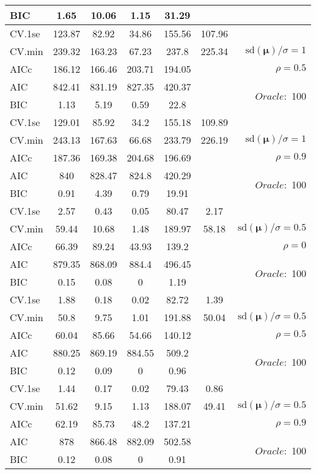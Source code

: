 \begin{table}
\begin{center}
\begin{tabular}{l*{5}{c}|r}
BIC & 1.65 & 10.06 & 1.15 & 31.29 & &  \\
 \hline 
CV.1se & 123.87 & 82.92 & 34.86 & 155.56 & 107.96 & \\
CV.min & 239.32 & 163.23 & 67.23 & 237.8 & 225.34 &  $\mathrm{sd}(\mathbf{\mu})/\sigma=1$ \\
AICc & 186.12 & 166.46 & 203.71 & 194.05 & & $\rho=0.5$ \\
AIC & 842.41 & 831.19 & 827.35 & 420.37 & &  \multirow{2}{*}{$Oracle: $ 100} \\
BIC & 1.13 & 5.19 & 0.59 & 22.8 & &  \\
 \hline 
CV.1se & 129.01 & 85.92 & 34.2 & 155.18 & 109.89 & \\
CV.min & 243.13 & 167.63 & 66.68 & 233.79 & 226.19 &  $\mathrm{sd}(\mathbf{\mu})/\sigma=1$ \\
AICc & 187.36 & 169.38 & 204.68 & 196.69 & & $\rho=0.9$ \\
AIC & 840 & 828.47 & 824.8 & 420.29 & &  \multirow{2}{*}{$Oracle: $ 100} \\
BIC & 0.91 & 4.39 & 0.79 & 19.91 & &  \\
 \hline 
CV.1se & 2.57 & 0.43 & 0.05 & 80.47 & 2.17 & \\
CV.min & 59.44 & 10.68 & 1.48 & 189.97 & 58.18 &  $\mathrm{sd}(\mathbf{\mu})/\sigma=0.5$ \\
AICc & 66.39 & 89.24 & 43.93 & 139.2 & & $\rho=0$ \\
AIC & 879.35 & 868.09 & 884.4 & 496.45 & &  \multirow{2}{*}{$Oracle: $ 100} \\
BIC & 0.15 & 0.08 & 0 & 1.19 & &  \\
 \hline 
CV.1se & 1.88 & 0.18 & 0.02 & 82.72 & 1.39 & \\
CV.min & 50.8 & 9.75 & 1.01 & 191.88 & 50.04 &  $\mathrm{sd}(\mathbf{\mu})/\sigma=0.5$ \\
AICc & 60.04 & 85.66 & 54.66 & 140.12 & & $\rho=0.5$ \\
AIC & 880.25 & 869.19 & 884.55 & 509.2 & &  \multirow{2}{*}{$Oracle: $ 100} \\
BIC & 0.12 & 0.09 & 0 & 0.96 & &  \\
 \hline 
CV.1se & 1.44 & 0.17 & 0.02 & 79.43 & 0.86 & \\
CV.min & 51.62 & 9.15 & 1.13 & 188.07 & 49.41 &  $\mathrm{sd}(\mathbf{\mu})/\sigma=0.5$ \\
AICc & 62.19 & 85.73 & 48.2 & 137.21 & & $\rho=0.9$ \\
AIC & 878 & 866.48 & 882.09 & 502.58 & &  \multirow{2}{*}{$Oracle: $ 100} \\
BIC & 0.12 & 0.08 & 0 & 0.91 & &  \\
 \hline 
\end{tabular}
\end{center}
\vspace{-1cm}
\end{table}




